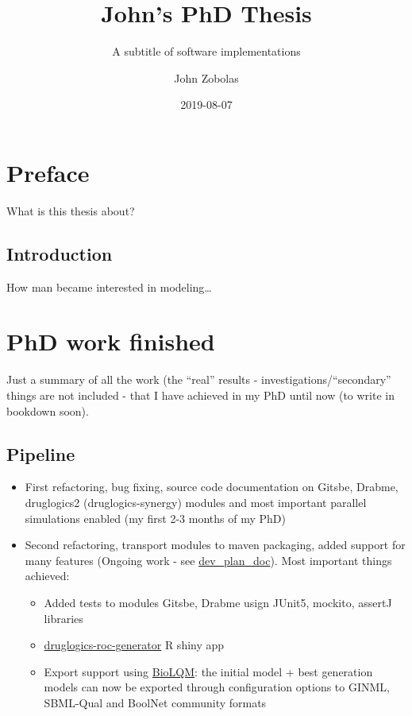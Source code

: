 \documentclass[12pt,]{book}
\title{John's PhD Thesis}
\subtitle{A subtitle of software implementations}
\author{John Zobolas}
\date{2019-08-07}
\providecommand{\tightlist}{%
  \setlength{\itemsep}{0pt}\setlength{\parskip}{0pt}}
\theoremstyle{definition}
\theoremstyle{definition}
\theoremstyle{definition}
\theoremstyle{remark}
\begin{document}
\maketitle

{
\hypersetup{linkcolor=black}
\setcounter{tocdepth}{1}
\tableofcontents
}
\listoftables
\listoffigures
\hypertarget{preface}{%
\chapter{Preface}\label{preface}}

What is this thesis about?

\hypertarget{introduction}{%
\section{Introduction}\label{introduction}}

How man became interested in modeling\ldots{}

\hypertarget{phd-work-finished}{%
\chapter{PhD work finished}\label{phd-work-finished}}

Just a summary of all the work (the ``real'' results - investigations/``secondary''
things are not included - that I have achieved in my PhD until now (to write
in bookdown soon).

\hypertarget{pipeline}{%
\section{Pipeline}\label{pipeline}}

\begin{itemize}
\tightlist
\item
  First refactoring, bug fixing, source code documentation on Gitsbe, Drabme,
  druglogics2 (druglogics-synergy) modules and most important parallel simulations
  enabled (my first 2-3 months of my PhD)
\item
  Second refactoring, transport modules to maven packaging, added support
  for many features (Ongoing work - see \href{https://docs.google.com/document/d/1OUupR0b-28YB9pVAww77RMecnFN6A39MYjXMjljmvG4/edit?usp=sharing}{dev\_plan\_doc}).
  Most important things achieved:

  \begin{itemize}
  \tightlist
  \item
    Added tests to modules Gitsbe, Drabme usign JUnit5, mockito, assertJ libraries
  \item
    \href{https://github.com/bblodfon/druglogics-roc-generator}{druglogics-roc-generator}
    R shiny app
  \item
    Export support using \href{https://github.com/colomoto/bioLQM}{BioLQM}: the
    initial model + best generation models can now be exported through configuration
    options to GINML, SBML-Qual and BoolNet community formats
  \end{itemize}
\end{itemize}
\end{document}
